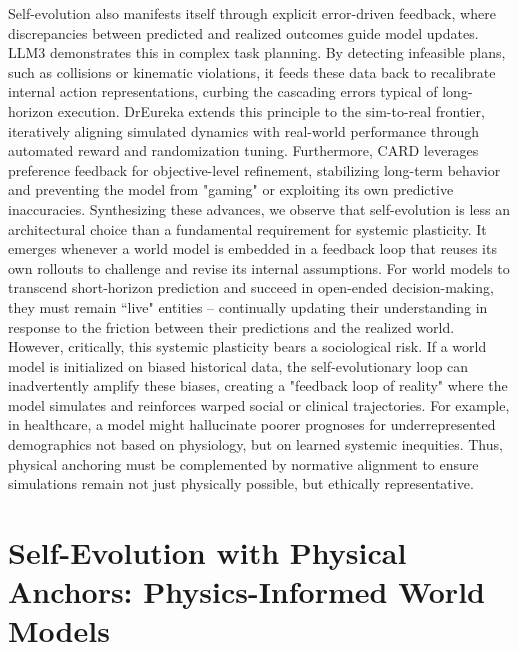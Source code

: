 \documentclass[pdflatex,sn-mathphys-num]{sn-jnl}
\theoremstyle{thmstyleone}%
\theoremstyle{thmstyletwo}%
\theoremstyle{thmstylethree}%
\begin{document}
Self-evolution also manifests itself through explicit error-driven feedback, where discrepancies between predicted and realized outcomes guide model updates. LLM3 \citep{wang2024llmˆ} demonstrates this in complex task planning. By detecting infeasible plans, such as collisions or kinematic violations, it feeds these data back to recalibrate internal action representations, curbing the cascading errors typical of long-horizon execution. DrEureka \citep{ma2024dreureka} extends this principle to the sim-to-real frontier, iteratively aligning simulated dynamics with real-world performance through automated reward and randomization tuning. Furthermore, CARD \citep{sun2025large} leverages preference feedback for objective-level refinement, stabilizing long-term behavior and preventing the model from "gaming" or exploiting its own predictive inaccuracies. Synthesizing these advances, we observe that self-evolution is less an architectural choice than a fundamental requirement for systemic plasticity. It emerges whenever a world model is embedded in a feedback loop that reuses its own rollouts to challenge and revise its internal assumptions. For world models to transcend short-horizon prediction and succeed in open-ended decision-making, they must remain ``live" entities --  continually updating their understanding in response to the friction between their predictions and the realized world. However, critically, this systemic plasticity bears a sociological risk. If a world model is initialized on biased historical data, the self-evolutionary loop can inadvertently amplify these biases, creating a "feedback loop of reality" where the model simulates and reinforces warped social or clinical trajectories. For example, in healthcare, a model might hallucinate poorer prognoses for underrepresented demographics not based on physiology, but on learned systemic inequities. Thus, physical anchoring must be complemented by normative alignment to ensure simulations remain not just physically possible, but ethically representative.




\section{Self-Evolution with Physical Anchors: Physics-Informed World Models}
\end{document}
